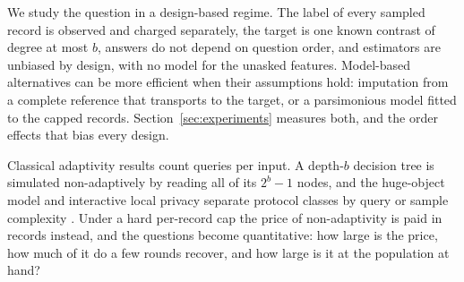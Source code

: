 \documentclass{article}
\begin{document}
We study the question in a design-based regime. The label of every sampled record is observed and charged separately, the target is one known contrast of degree at most $b$, answers do not depend on question order, and estimators are unbiased by design, with no model for the unasked features. Model-based alternatives can be more efficient when their assumptions hold: imputation from a complete reference that transports to the target, or a parsimonious model fitted to the capped records. Section~\ref{sec:experiments} measures both, and the order effects that bias every design.

Classical adaptivity results count queries per input. A depth-$b$ decision tree is simulated non-adaptively by reading all of its $2^b-1$ nodes, and the huge-object model and interactive local privacy separate protocol classes by query or sample complexity \citep{goldreich2022,adar2024,joseph2019,joseph2020}. Under a hard per-record cap the price of non-adaptivity is paid in records instead, and the questions become quantitative: how large is the price, how much of it do a few rounds recover, and how large is it at the population at hand?
\end{document}
